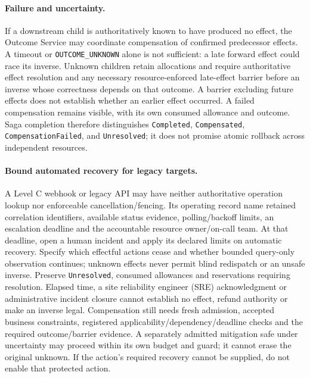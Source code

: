 \paragraph{Failure and uncertainty.}
If a downstream child is authoritatively known to have produced no effect, the Outcome Service may coordinate compensation of confirmed predecessor effects. A timeout or \texttt{OUTCOME\_UNKNOWN} alone is not sufficient: a late forward effect could race its inverse. Unknown children retain allocations and require authoritative effect resolution and any necessary resource-enforced late-effect barrier before an inverse whose correctness depends on that outcome. A barrier excluding future effects does not establish whether an earlier effect occurred. A failed compensation remains visible, with its own consumed allowance and outcome. Saga completion therefore distinguishes \texttt{Completed}, \texttt{Compensated}, \texttt{CompensationFailed}, and \texttt{Unresolved}; it does not promise atomic rollback across independent resources.

\paragraph{Bound automated recovery for legacy targets.}
A Level C webhook or legacy API may have neither authoritative operation lookup nor enforceable cancellation/fencing. Its operating record  name retained correlation identifiers, available status evidence, polling/backoff limits, an escalation deadline and the accountable resource owner/on-call team. At that deadline, open a human incident and apply its declared limits on automatic recovery. Specify which effectful actions cease and whether bounded query-only observation continues; unknown effects never permit blind redispatch or an unsafe inverse. Preserve \texttt{Unresolved}, consumed allowances and reservations requiring resolution. Elapsed time, a site reliability engineer (SRE) acknowledgment or administrative incident closure cannot establish no effect, refund authority or make an inverse legal. Compensation still needs fresh admission, accepted business constraints, registered applicability/dependency/deadline checks and the required outcome/barrier evidence. A separately admitted mitigation safe under uncertainty may proceed within its own budget and guard; it cannot erase the original unknown. If the action's required recovery cannot be supplied, do not enable that protected action.

